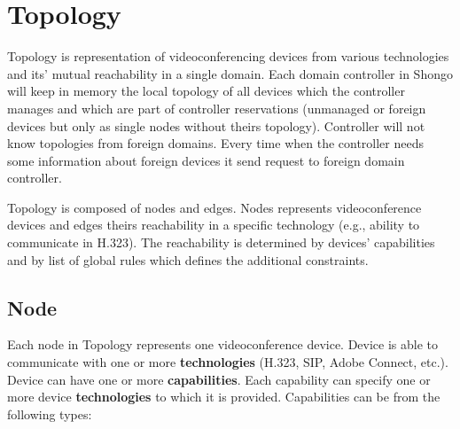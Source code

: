 \documentclass[a4paper]{report}
\begin{document}
\chapter{Topology}

Topology is representation of videoconferencing devices from various 
technologies and its' mutual reachability in a single domain. Each domain 
controller in Shongo will keep in memory the local topology of all devices 
which the controller manages and which are part of controller reservations (unmanaged or foreign devices but only as single nodes without theirs topology).
Controller will not know topologies from foreign domains. Every time when the 
controller needs some information about foreign devices it send request to 
foreign domain controller.

Topology is composed of nodes and edges. Nodes represents videoconference 
devices and edges theirs reachability in a specific technology (e.g., ability 
to communicate in H.323). The reachability is determined by devices' capabilities and by list of global rules which defines the additional constraints.

\section{Node}

Each node in Topology represents one videoconference device. Device is able to 
communicate with one or more \textbf{technologies} (H.323, SIP, Adobe Connect, 
etc.).
\\
Device can have one or more \textbf{capabilities}. Each capability can specify 
one or more device \textbf{technologies} to which it is provided. Capabilities 
can be from the following types:
\end{document}
